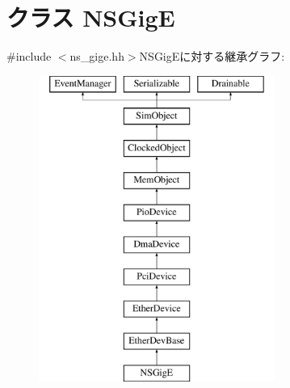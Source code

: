 \hypertarget{classNSGigE}{
\section{クラス NSGigE}
\label{classNSGigE}
}


{\ttfamily \#include $<$ns\_\-gige.hh$>$}NSGigEに対する継承グラフ:\begin{figure}[H]
\begin{center}
\leavevmode
\includegraphics[height=10cm]{classNSGigE}
\end{center}
\end{figure}
